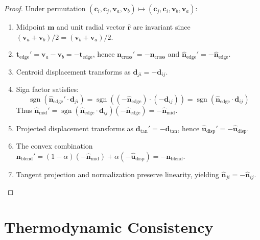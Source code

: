 \documentclass[11pt,a4paper]{article}
\theoremstyle{definition}
\begin{document}
\begin{proof}
Under permutation $(\mathbf{c}_i, \mathbf{c}_j, \mathbf{v}_a, \mathbf{v}_b) \mapsto (\mathbf{c}_j, \mathbf{c}_i, \mathbf{v}_b, \mathbf{v}_a)$:
\begin{enumerate}
    \item Midpoint $\mathbf{m}$ and unit radial vector $\hat{\mathbf{r}}$ are invariant since $(\mathbf{v}_a + \mathbf{v}_b)/2 = (\mathbf{v}_b + \mathbf{v}_a)/2$.
    \item $\mathbf{t}_{\text{edge}}' = \mathbf{v}_a - \mathbf{v}_b = -\mathbf{t}_{\text{edge}}$, hence $\mathbf{n}_{\text{cross}}' = -\mathbf{n}_{\text{cross}}$ and $\hat{\mathbf{n}}_{\text{edge}}' = -\hat{\mathbf{n}}_{\text{edge}}$.
    \item Centroid displacement transforms as $\mathbf{d}_{ji} = -\mathbf{d}_{ij}$.
    \item Sign factor satisfies:
    \begin{equation*}
        \operatorname{sgn}\left(\hat{\mathbf{n}}_{\text{edge}}' \cdot \mathbf{d}_{ji}\right) = \operatorname{sgn}\left((-\hat{\mathbf{n}}_{\text{edge}}) \cdot (-\mathbf{d}_{ij})\right) = \operatorname{sgn}\left(\hat{\mathbf{n}}_{\text{edge}} \cdot \mathbf{d}_{ij}\right)
    \end{equation*}
    Thus $\hat{\mathbf{n}}_{\text{mid}}' = \operatorname{sgn}(\hat{\mathbf{n}}_{\text{edge}} \cdot \mathbf{d}_{ij})(-\hat{\mathbf{n}}_{\text{edge}}) = -\hat{\mathbf{n}}_{\text{mid}}$.
    \item Projected displacement transforms as $\mathbf{d}_{\text{tan}}' = -\mathbf{d}_{\text{tan}}$, hence $\hat{\mathbf{u}}_{\text{disp}}' = -\hat{\mathbf{u}}_{\text{disp}}$.
    \item The convex combination $\mathbf{n}_{\text{blend}}' = (1-\alpha)(-\hat{\mathbf{n}}_{\text{mid}}) + \alpha(-\hat{\mathbf{u}}_{\text{disp}}) = -\mathbf{n}_{\text{blend}}$.
    \item Tangent projection and normalization preserve linearity, yielding $\hat{\mathbf{n}}_{ji} = -\hat{\mathbf{n}}_{ij}$.
\end{enumerate}
\end{proof}

\section{Thermodynamic Consistency}
\end{document}
